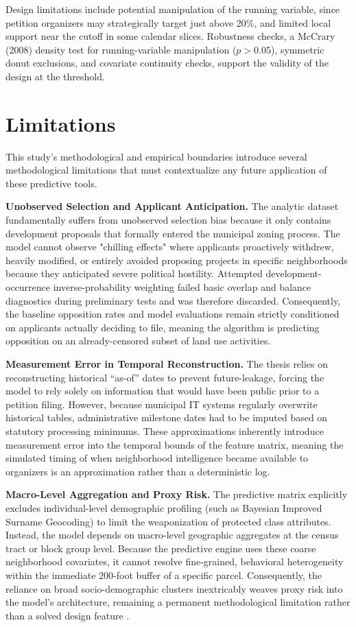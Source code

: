\documentclass[11pt, letterpaper, oneside]{article}
\begin{document}
Design limitations include potential manipulation of the running variable, since petition organizers may strategically target just above 20\%, and limited local support near the cutoff in some calendar slices. Robustness checks, a McCrary (2008) density test for running-variable manipulation \cite{mccrary2008manipulation} ($p > 0.05$), symmetric donut exclusions, and covariate continuity checks, support the validity of the design at the threshold.


\section{Limitations}
\label{sec:limitations}

This study's methodological and empirical boundaries introduce several methodological limitations that must contextualize any future application of these predictive tools. 

\textbf{Unobserved Selection and Applicant Anticipation.} The analytic dataset fundamentally suffers from unobserved selection bias because it only contains development proposals that formally entered the municipal zoning process. The model cannot observe "chilling effects" where applicants proactively withdrew, heavily modified, or entirely avoided proposing projects in specific neighborhoods because they anticipated severe political hostility. Attempted development-occurrence inverse-probability weighting failed basic overlap and balance diagnostics during preliminary tests and was therefore discarded. Consequently, the baseline opposition rates and model evaluations remain strictly conditioned on applicants actually deciding to file, meaning the algorithm is predicting opposition on an already-censored subset of land use activities.

\textbf{Measurement Error in Temporal Reconstruction.} The thesis relies on reconstructing historical ``as-of'' dates to prevent future-leakage, forcing the model to rely solely on information that would have been public prior to a petition filing. However, because municipal IT systems regularly overwrite historical tables, administrative milestone dates had to be imputed based on statutory processing minimums. These approximations inherently introduce measurement error into the temporal bounds of the feature matrix, meaning the simulated timing of when neighborhood intelligence became available to organizers is an approximation rather than a deterministic log.

\textbf{Macro-Level Aggregation and Proxy Risk.} The predictive matrix explicitly excludes individual-level demographic profiling (such as Bayesian Improved Surname Geocoding) to limit the weaponization of protected class attributes. Instead, the model depends on macro-level geographic aggregates at the census tract or block group level. Because the predictive engine uses these coarse neighborhood covariates, it cannot resolve fine-grained, behavioral heterogeneity within the immediate 200-foot buffer of a specific parcel. Consequently, the reliance on broad socio-demographic clusters inextricably weaves proxy risk into the model's architecture, remaining a permanent methodological limitation rather than a solved design feature \cite{barocas2016,benjamin2019race,obermeyer2019racial}. 
\end{document}
